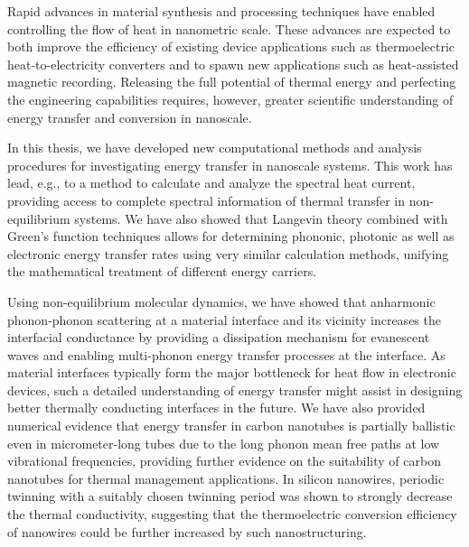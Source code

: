 
Rapid advances in material synthesis and processing techniques have enabled controlling the flow of heat in nanometric scale. These advances are expected to both improve the efficiency of existing device applications such as thermoelectric heat-to-electricity converters and to spawn new applications such as heat-assisted magnetic recording. Releasing the full potential of thermal energy and perfecting the engineering capabilities requires, however, greater scientific understanding of energy transfer and conversion in nanoscale.

In this thesis, we have developed new computational methods and analysis procedures for investigating energy transfer in nanoscale systems. This work has lead, e.g., to a method to calculate and analyze the spectral heat current, providing access to complete spectral information of thermal transfer in non-equilibrium systems. We have also showed that Langevin theory combined with Green's function techniques allows for determining phononic, photonic as well as electronic energy transfer rates using very similar calculation methods, unifying the mathematical treatment of different energy carriers. %

Using non-equilibrium molecular dynamics, we have showed that anharmonic phonon-phonon scattering at a material interface and its vicinity increases the interfacial conductance by providing a dissipation mechanism for evanescent waves and enabling multi-phonon energy transfer processes at the interface. As material interfaces typically form the major bottleneck for heat flow in electronic devices, such a detailed understanding of energy transfer might assist in designing better thermally conducting interfaces in the future. We have also provided numerical evidence that energy transfer in carbon nanotubes is partially ballistic even in micrometer-long tubes due to the long phonon mean free paths at low vibrational frequencies, providing further evidence on the suitability of carbon nanotubes for thermal management applications. In silicon nanowires, periodic twinning with a suitably chosen twinning period was shown to strongly decrease the thermal conductivity, suggesting that the thermoelectric conversion efficiency of nanowires could be further increased by such nanostructuring. 

